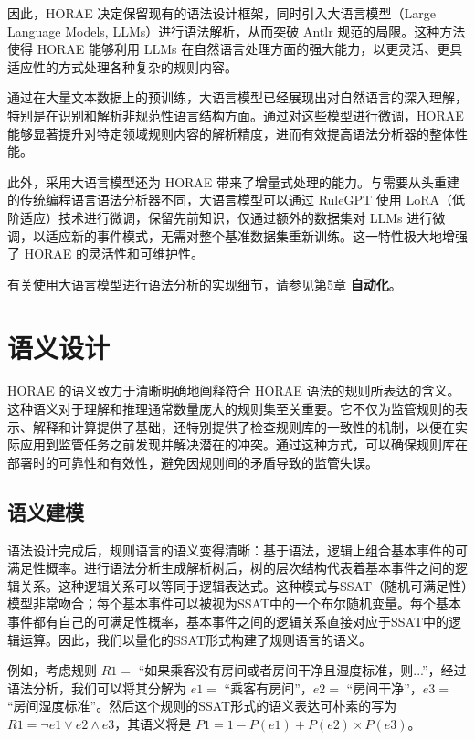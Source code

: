因此，HORAE 决定保留现有的语法设计框架，同时引入大语言模型（Large Language Models, LLMs）进行语法解析，从而突破 Antlr 规范的局限。这种方法使得 HORAE 能够利用 LLMs 在自然语言处理方面的强大能力，以更灵活、更具适应性的方式处理各种复杂的规则内容。

通过在大量文本数据上的预训练，大语言模型已经展现出对自然语言的深入理解，特别是在识别和解析非规范性语言结构方面。通过对这些模型进行微调，HORAE 能够显著提升对特定领域规则内容的解析精度，进而有效提高语法分析器的整体性能。

此外，采用大语言模型还为 HORAE 带来了增量式处理的能力。与需要从头重建的传统编程语言语法分析器不同，大语言模型可以通过 RuleGPT 使用 LoRA（低阶适应）技术进行微调，保留先前知识，仅通过额外的数据集对 LLMs 进行微调，以适应新的事件模式，无需对整个基准数据集重新训练。这一特性极大地增强了 HORAE 的灵活性和可维护性。

有关使用大语言模型进行语法分析的实现细节，请参见第5章 \textbf{自动化}。

\cleardoublepage

\section{语义设计}

HORAE 的语义致力于清晰明确地阐释符合 HORAE 语法的规则所表达的含义。这种语义对于理解和推理通常数量庞大的规则集至关重要。它不仅为监管规则的表示、解释和计算提供了基础，还特别提供了检查规则库的一致性的机制，以便在实际应用到监管任务之前发现并解决潜在的冲突。通过这种方式，可以确保规则库在部署时的可靠性和有效性，避免因规则间的矛盾导致的监管失误。

\subsection{语义建模}

语法设计完成后，规则语言的语义变得清晰：基于语法，逻辑上组合基本事件的可满足性概率。进行语法分析生成解析树后，树的层次结构代表着基本事件之间的逻辑关系。这种逻辑关系可以等同于逻辑表达式。这种模式与SSAT（随机可满足性）模型非常吻合；每个基本事件可以被视为SSAT中的一个布尔随机变量。每个基本事件都有自己的可满足性概率，基本事件之间的逻辑关系直接对应于SSAT中的逻辑运算。因此，我们以量化的SSAT形式构建了规则语言的语义。

例如，考虑规则 $R1=$ “如果乘客没有房间或者房间干净且湿度标准，则...”，经过语法分析，我们可以将其分解为 $e1=$ “乘客有房间”，$e2=$ “房间干净”，$e3=$ “房间湿度标准”。然后这个规则的SSAT形式的语义表达可朴素的写为 $R1=\neg e1 \vee e2 \wedge e3$，其语义将是 $P1=1-P(e1)+P(e2)\times P(e3)$。

